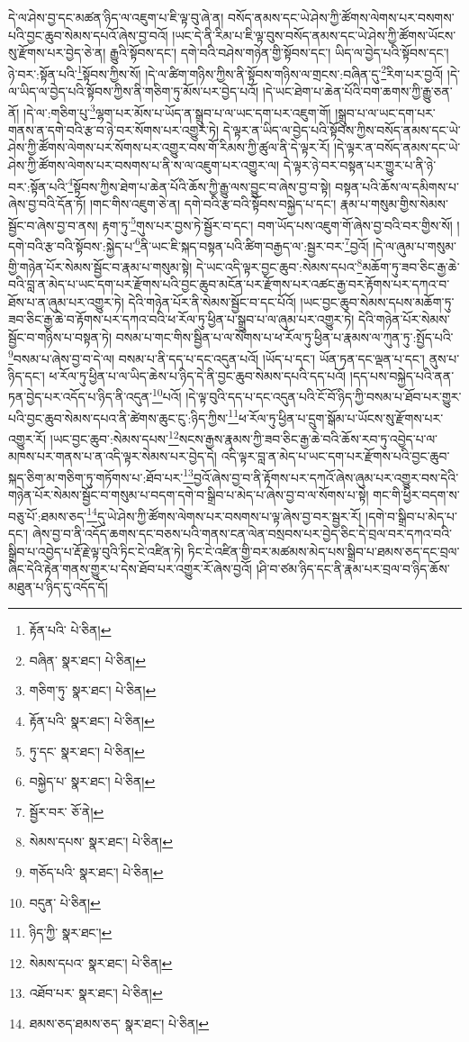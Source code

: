 དེ་ལ་ཤེས་བྱ་དང་མཚན་ཉིད་ལ་འཇུག་པ་ཇི་ལྟ་བུ་ཞེ་ན། བསོད་ནམས་དང་ཡེ་ཤེས་ཀྱི་ཚོགས་ལེགས་པར་བསགས་པའི་བྱང་ཆུབ་སེམས་དཔའོ་ཞེས་བྱ་བའོ། །ཡང་དེ་ནི་རིམ་པ་ཇི་ལྟ་བུས་བསོད་ནམས་དང་ཡེ་ཤེས་ཀྱི་ཚོགས་ཡོངས་སུ་རྫོགས་པར་བྱེད་ཅེ་ན། རྒྱུའི་སྟོབས་དང་། དགེ་བའི་བཤེས་གཉེན་གྱི་སྟོབས་དང་། ཡིད་ལ་བྱེད་པའི་སྟོབས་དང་། ཉེ་བར་:སྟོན་པའི་\footnote{རྟོན་པའི་  པེ་ཅིན། }སྟོབས་ཀྱིས་སོ། །དེ་ལ་ཚིག་གཉིས་ཀྱིས་ནི་སྟོབས་གཉིས་ལ་གྲངས་:བཞིན་དུ་\footnote{བཞིན་  སྣར་ཐང་།  པེ་ཅིན། }རིག་པར་བྱའོ། །དེ་ལ་ཡིད་ལ་བྱེད་པའི་སྟོབས་ཀྱིས་ནི་གཅིག་ཏུ་མོས་པར་བྱེད་པའོ། །དེ་ཡང་ཐེག་པ་ཆེན་པོའི་བག་ཆགས་ཀྱི་རྒྱུ་ཅན་ནོ། །དེ་ལ་:གཅིག་པུ་\footnote{གཅིག་ཏུ་  སྣར་ཐང་།  པེ་ཅིན། }ལྷག་པར་མོས་པ་ཡོད་ན་སྒྲུབ་པ་ལ་ཡང་དག་པར་འཇུག་གོ། །སྒྲུབ་པ་ལ་ཡང་དག་པར་གནས་ན་དགེ་བའི་རྩ་བ་ཉེ་བར་སོགས་པར་འགྱུར་ཏེ། དེ་ལྟར་ན་ཡིད་ལ་བྱེད་པའི་སྟོབས་ཀྱིས་བསོད་ནམས་དང་ཡེ་ཤེས་ཀྱི་ཚོགས་ལེགས་པར་སོགས་པར་འགྱུར་བས་གོ་རིམས་ཀྱི་ཚུལ་ནི་དེ་ལྟར་རོ། །དེ་ལྟར་ན་བསོད་ནམས་དང་ཡེ་ཤེས་ཀྱི་ཚོགས་ལེགས་པར་བསགས་པ་ནི་ས་ལ་འཇུག་པར་འགྱུར་ལ། དེ་ལྟར་ཉེ་བར་བསྟན་པར་གྱུར་པ་ནི་ཉེ་བར་:སྟོན་པའི་\footnote{རྟོན་པའི་  སྣར་ཐང་།  པེ་ཅིན། }སྟོབས་ཀྱིས་ཐེག་པ་ཆེན་པོའི་ཆོས་ཀྱི་རྒྱུ་ལས་བྱུང་བ་ཞེས་བྱ་བ་སྟེ། བསྟན་པའི་ཆོས་ལ་དམིགས་པ་ཞེས་བྱ་བའི་དོན་ཏོ། །གང་གིས་འཇུག་ཅེ་ན། དགེ་བའི་རྩ་བའི་སྟོབས་བསྐྱེད་པ་དང་། རྣམ་པ་གསུམ་གྱིས་སེམས་སྦྱོང་བ་ཞེས་བྱ་བ་ནས། རྟག་ཏུ་\footnote{ཏུ་དང་  སྣར་ཐང་།  པེ་ཅིན། }གུས་པར་བྱས་ཏེ་སྦྱོར་བ་དང་། བག་ཡོད་པས་འཇུག་གོ་ཞེས་བྱ་བའི་བར་གྱིས་སོ། །དགེ་བའི་རྩ་བའི་སྟོབས་:སྐྱེད་པ་\footnote{བསྐྱེད་པ་  སྣར་ཐང་།  པེ་ཅིན། }ནི་ཡང་ཇི་སྐད་བསྟན་པའི་ཚིག་བརྒྱད་ལ་:སྦྱར་བར་\footnote{སྦྱོར་བར་  ཅོ་ནེ། }བྱའོ། །དེ་ལ་ཞུམ་པ་གསུམ་གྱི་གཉེན་པོར་སེམས་སྦྱོང་བ་རྣམ་པ་གསུམ་སྟེ། དེ་ཡང་འདི་ལྟར་བྱང་ཆུབ་:སེམས་དཔའ་\footnote{སེམས་དཔས་  སྣར་ཐང་།  པེ་ཅིན། }མཆོག་ཏུ་ཟབ་ཅིང་རྒྱ་ཆེ་བའི་བླ་ན་མེད་པ་ཡང་དག་པར་རྫོགས་པའི་བྱང་ཆུབ་མངོན་པར་རྫོགས་པར་འཚང་རྒྱ་བར་རྟོགས་པར་དཀའ་བ་ཐོས་པ་ན་ཞུམ་པར་འགྱུར་ཏེ། དེའི་གཉེན་པོར་ནི་སེམས་སྦྱོང་བ་དང་པོའོ། །ཡང་བྱང་ཆུབ་སེམས་དཔས་མཆོག་ཏུ་ཟབ་ཅིང་རྒྱ་ཆེ་བ་རྟོགས་པར་དཀའ་བའི་ཕ་རོལ་ཏུ་ཕྱིན་པ་སྒྲུབ་པ་ལ་ཞུམ་པར་འགྱུར་ཏེ། དེའི་གཉེན་པོར་སེམས་སྦྱོང་བ་གཉིས་པ་བསྟན་ཏེ། བསམ་པ་གང་གིས་སྦྱིན་པ་ལ་སོགས་པ་ཕ་རོལ་ཏུ་ཕྱིན་པ་རྣམས་ལ་ཀུན་ཏུ་:སྤྱོད་པའི་\footnote{གཅོད་པའི་  སྣར་ཐང་།  པེ་ཅིན། }བསམ་པ་ཞེས་བྱ་བ་དེ་ལ། བསམ་པ་ནི་དད་པ་དང་འདུན་པའོ། །ཡོད་པ་དང་། ཡོན་ཏན་དང་ལྡན་པ་དང་། ནུས་པ་ཉིད་དང་། ཕ་རོལ་ཏུ་ཕྱིན་པ་ལ་ཡིད་ཆེས་པ་ཉིད་དེ་ནི་བྱང་ཆུབ་སེམས་དཔའི་དད་པའོ། །དད་པས་བསྐྱེད་པའི་ནན་ཏན་བྱེད་པར་འདོད་པ་ཉིད་ནི་འདུན་\footnote{བདུན་  པེ་ཅིན། }པའོ། །དེ་ལྟ་བུའི་དད་པ་དང་འདུན་པའི་ངོ་བོ་ཉིད་ཀྱི་བསམ་པ་ཐོབ་པར་གྱུར་པའི་བྱང་ཆུབ་སེམས་དཔའ་ནི་ཚེགས་ཆུང་ངུ་:ཉིད་ཀྱིས་\footnote{ཉིད་ཀྱི་  སྣར་ཐང་། }ཕ་རོལ་ཏུ་ཕྱིན་པ་དྲུག་སྒོམ་པ་ཡོངས་སུ་རྫོགས་པར་འགྱུར་རོ། །ཡང་བྱང་ཆུབ་:སེམས་དཔས་\footnote{སེམས་དཔའ་  སྣར་ཐང་།  པེ་ཅིན། }སངས་རྒྱས་རྣམས་ཀྱི་ཟབ་ཅིང་རྒྱ་ཆེ་བའི་ཆོས་རབ་ཏུ་འབྱེད་པ་ལ་མཁས་པར་གནས་པ་ན་འདི་ལྟར་སེམས་པར་བྱེད་དེ། འདི་ལྟར་བླ་ན་མེད་པ་ཡང་དག་པར་རྫོགས་པའི་བྱང་ཆུབ་སྐད་ཅིག་མ་གཅིག་ཏུ་གཏོགས་པ་:ཐོབ་པར་\footnote{འཐོབ་པར་  སྣར་ཐང་།  པེ་ཅིན། }བྱའོ་ཞེས་བྱ་བ་ནི་རྟོགས་པར་དཀའོ་ཞེས་ཞུམ་པར་འགྱུར་བས་དེའི་གཉེན་པོར་སེམས་སྦྱོང་བ་གསུམ་པ་བདག་དགེ་བ་སྒྲིབ་པ་མེད་པ་ཞེས་བྱ་བ་ལ་སོགས་པ་སྟེ། གང་གི་ཕྱིར་བདག་ས་བཅུ་པོ་:ཐམས་ཅད་\footnote{ཐམས་ཅད་ཐམས་ཅད་  སྣར་ཐང་།  པེ་ཅིན། }དུ་ཡེ་ཤེས་ཀྱི་ཚོགས་ལེགས་པར་བསགས་པ་ལྟ་ཞེས་བྱ་བར་སྦྱར་རོ། །དགེ་བ་སྒྲིབ་པ་མེད་པ་དང་། ཞེས་བྱ་བ་ནི་འདོད་ཆགས་དང་བཅས་པའི་གནས་ངན་ལེན་བསྲབས་པར་བྱེད་ཅིང་དེ་བྲལ་བར་དཀའ་བའི་སྒྲིབ་པ་འབྱེད་པ་རྡོ་རྗེ་ལྟ་བུའི་ཏིང་ངེ་འཛིན་ཏེ། ཏིང་ངེ་འཛིན་གྱི་བར་མཚམས་མེད་པས་སྒྲིབ་པ་ཐམས་ཅད་དང་བྲལ་ཞིང་དེའི་རྟེན་གནས་གྱུར་པ་དེས་ཐོབ་པར་འགྱུར་རོ་ཞེས་བྱའོ། །ཤི་བ་ཙམ་ཉིད་དང་ནི་རྣམ་པར་བྲལ་བ་ཉིད་ཆོས་མཐུན་པ་ཉིད་དུ་འདོད་དོ། 